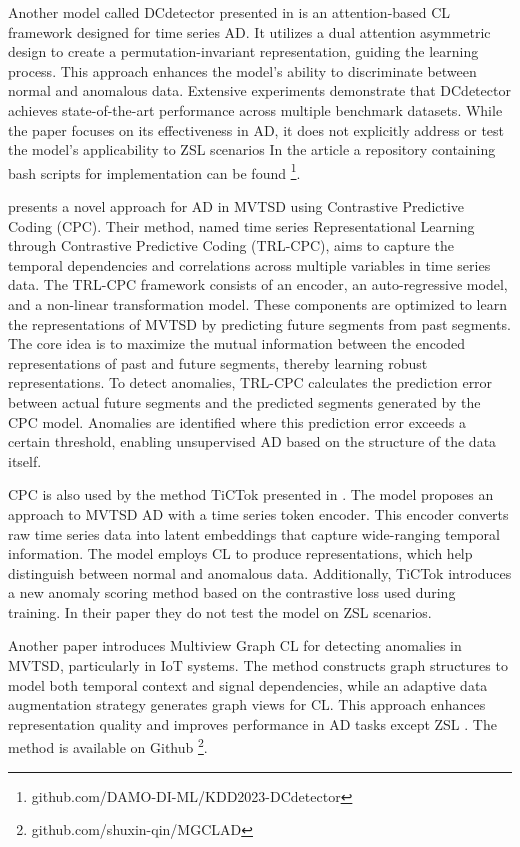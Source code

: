 Another model called DCdetector presented in \cite{yang_dcdetector_2023} is an attention-based CL framework designed for time series AD. It utilizes a dual attention asymmetric design to create a permutation-invariant representation, guiding the learning process. This approach enhances the model's ability to discriminate between normal and anomalous data. Extensive experiments demonstrate that DCdetector achieves state-of-the-art performance across multiple benchmark datasets. While the paper focuses on its effectiveness in AD, it does not explicitly address or test the model's applicability to ZSL scenarios \cite{yang_dcdetector_2023} In the article a repository containing bash scripts for implementation can be found \footnote{\fussy\tiny github.com/DAMO-DI-ML/KDD2023-DCdetector}.

\cite{pranavan_contrastive_2022} presents a novel approach for AD in MVTSD using Contrastive Predictive Coding (CPC). Their method, named time series Representational Learning through Contrastive Predictive Coding (TRL-CPC), aims to capture the temporal dependencies and correlations across multiple variables in time series data.
The TRL-CPC framework consists of an encoder, an auto-regressive model, and a non-linear transformation model. These components are optimized to learn the representations of MVTSD by predicting future segments from past segments. The core idea is to maximize the mutual information between the encoded representations of past and future segments, thereby learning robust representations.
To detect anomalies, TRL-CPC calculates the prediction error between actual future segments and the predicted segments generated by the CPC model. Anomalies are identified where this prediction error exceeds a certain threshold, enabling unsupervised AD based on the structure of the data itself.

CPC is also used by the method TiCTok presented in \cite{kang_tictok_2023}. The model proposes an approach to MVTSD AD with a time series token encoder. This encoder converts raw time series data into latent embeddings that capture wide-ranging temporal information. The model employs CL to produce representations, which help distinguish between normal and anomalous data. Additionally, TiCTok introduces a new anomaly scoring method based on the contrastive loss used during training. In their paper they do not test the model on ZSL scenarios.

Another paper introduces Multiview Graph CL for detecting anomalies in MVTSD, particularly in IoT systems. The method constructs graph structures to model both temporal context and signal dependencies, while an adaptive data augmentation strategy generates graph views for CL. This approach enhances representation quality and improves performance in AD tasks except ZSL \cite{qin_multiview_2023}. The method is available on Github \footnote{\fussy\tiny github.com/shuxin-qin/MGCLAD}.

